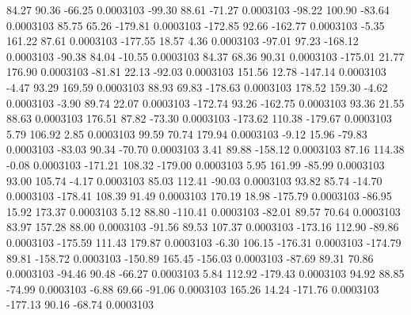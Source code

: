        84.27       90.36      -66.25     0.0003103
      -99.30       88.61      -71.27     0.0003103
      -98.22      100.90      -83.64     0.0003103
       85.75       65.26     -179.81     0.0003103
     -172.85       92.66     -162.77     0.0003103
       -5.35      161.22       87.61     0.0003103
     -177.55       18.57        4.36     0.0003103
      -97.01       97.23     -168.12     0.0003103
      -90.38       84.04      -10.55     0.0003103
       84.37       68.36       90.31     0.0003103
     -175.01       21.77      176.90     0.0003103
      -81.81       22.13      -92.03     0.0003103
      151.56       12.78     -147.14     0.0003103
       -4.47       93.29      169.59     0.0003103
       88.93       69.83     -178.63     0.0003103
      178.52      159.30       -4.62     0.0003103
       -3.90       89.74       22.07     0.0003103
     -172.74       93.26     -162.75     0.0003103
       93.36       21.55       88.63     0.0003103
      176.51       87.82      -73.30     0.0003103
     -173.62      110.38     -179.67     0.0003103
        5.79      106.92        2.85     0.0003103
       99.59       70.74      179.94     0.0003103
       -9.12       15.96      -79.83     0.0003103
      -83.03       90.34      -70.70     0.0003103
        3.41       89.88     -158.12     0.0003103
       87.16      114.38       -0.08     0.0003103
     -171.21      108.32     -179.00     0.0003103
        5.95      161.99      -85.99     0.0003103
       93.00      105.74       -4.17     0.0003103
       85.03      112.41      -90.03     0.0003103
       93.82       85.74      -14.70     0.0003103
     -178.41      108.39       91.49     0.0003103
      170.19       18.98     -175.79     0.0003103
      -86.95       15.92      173.37     0.0003103
        5.12       88.80     -110.41     0.0003103
      -82.01       89.57       70.64     0.0003103
       83.97      157.28       88.00     0.0003103
      -91.56       89.53      107.37     0.0003103
     -173.16      112.90      -89.86     0.0003103
     -175.59      111.43      179.87     0.0003103
       -6.30      106.15     -176.31     0.0003103
     -174.79       89.81     -158.72     0.0003103
     -150.89      165.45     -156.03     0.0003103
      -87.69       89.31       70.86     0.0003103
      -94.46       90.48      -66.27     0.0003103
        5.84      112.92     -179.43     0.0003103
       94.92       88.85      -74.99     0.0003103
       -6.88       69.66      -91.06     0.0003103
      165.26       14.24     -171.76     0.0003103
     -177.13       90.16      -68.74     0.0003103
